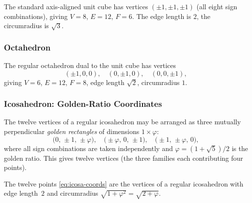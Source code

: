 The standard axis-aligned unit cube has vertices $(\pm 1,\pm 1,\pm 1)$
(all eight sign combinations), giving $V = 8$, $E = 12$, $F = 6$.
The edge length is $2$, the circumradius is $\sqrt{3}$.

\subsubsection{Octahedron}
\label{subsubsec:octa-coords}

The regular octahedron dual to the unit cube has vertices
\[
  (\pm 1,0,0),\quad (0,\pm 1,0),\quad (0,0,\pm 1),
\]
giving $V = 6$, $E = 12$, $F = 8$, edge length $\sqrt{2}$,
circumradius $1$.

\subsubsection{Icosahedron: Golden-Ratio Coordinates}
\label{subsubsec:icosa-coords}

The twelve vertices of a regular icosahedron may be arranged as three mutually
perpendicular \emph{golden rectangles} of dimensions $1 \times \varphi$:
\begin{equation}
  \bigl(0,\,\pm 1,\,\pm\varphi\bigr),\quad
  \bigl(\pm\varphi,\,0,\,\pm 1\bigr),\quad
  \bigl(\pm 1,\,\pm\varphi,\,0\bigr),
  \label{eq:icosa-coords}
\end{equation}
where all sign combinations are taken independently and
$\varphi = (1+\sqrt{5})/2$ is the golden ratio.  This gives twelve vertices
(the three families each contributing four points).

\begin{proposition}
\label{prop:icosa-regular}
The twelve points \eqref{eq:icosa-coords} are the vertices of a regular
icosahedron with edge length~$2$ and circumradius $\sqrt{1+\varphi^2} = \sqrt{2+\varphi}$.
\end{proposition}

